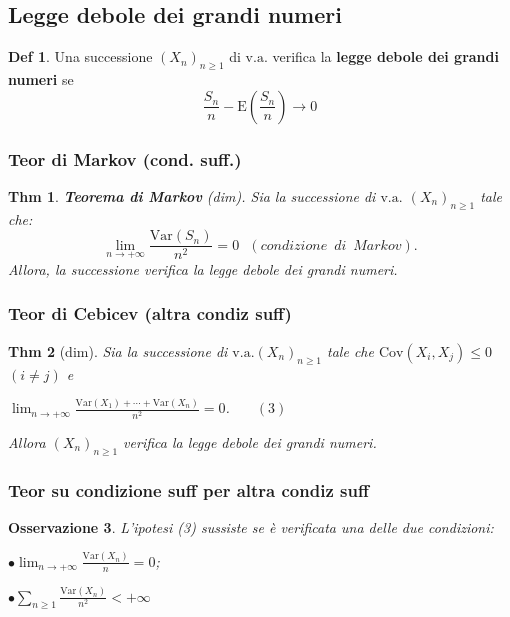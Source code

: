 \documentclass[a4paper,11pt]{article}
\theoremstyle{plain}
\newtheorem{thm}{Thm}[section]
\newtheorem{oss}[thm]{Osservazione}
\theoremstyle{definition}
\newtheorem{defn}{Def}[section]
\theoremstyle{remark}
\begin{document}
\subsection{Legge debole dei grandi numeri}
\begin{defn}
Una successione $(X_{n})_{n\geq 1}$ di $\mathrm{v}.\mathrm{a}.$ verifica la\textbf{ legge debole dei grandi numeri}
se
$$
\frac{S_{n}}{n}-\mathrm{E}\left (\frac{S_{n}}{n}\right)\rightarrow 0
$$
\end{defn}

\subsubsection{Teor di Markov (cond. suff.)}
\begin{thm} \textbf{Teorema di Markov}\; (dim).
 Sia la successione di $\mathrm{v}.\mathrm{a}. $ $(X_{n})_{n\geq 1}$ tale che:
 $$
 \displaystyle \lim_{n\rightarrow+\infty}\frac{\mathrm{V}\mathrm{a}\mathrm{r}(S_{n})}{n^{2}}=0 \,\,\,\, (condizione \,\,\, di \,\,\,Markov).$$
\noindent
Allora, la successione verifica la legge debole dei grandi numeri.
\end{thm}

\subsubsection{Teor di Cebicev (altra condiz suff)}
\begin{thm}[dim]
Sia la successione di $\mathrm{v}.\mathrm{a}. (X_{n})_{n\geq 1}$ tale che $\mathrm{C}\mathrm{o}\mathrm{v}(X_{i}, X_{j})\leq 0 $ $(i\neq j)$ e
\begin{center}
$\displaystyle \lim_{n\rightarrow+\infty}\frac{\mathrm{V}\mathrm{a}\mathrm{r}(X_{1})+\cdots+\mathrm{V}\mathrm{a}\mathrm{r}(X_{n})}{n^{2}}=0$. $\,\,\,\,\,\,\,\,\, (3)$
\end{center}
Allora $(X_{n})_{n\geq 1}$ verifica la legge debole dei grandi numeri.
\end{thm}

\subsubsection{Teor su condizione suff per altra condiz suff}
\begin{oss}
L'ipotesi (3) sussiste se è verificata una delle due condizioni:

$\displaystyle \bullet\lim_{n\rightarrow+\infty}\frac{\mathrm{V}\mathrm{a}\mathrm{r}(X_{n})}{n}=0$;

$\displaystyle \bullet\sum_{n\geq 1}\frac{\mathrm{V}\mathrm{a}\mathrm{r}(X_{n})}{n^{2}}<+\infty$
\end{oss}
\end{document}
